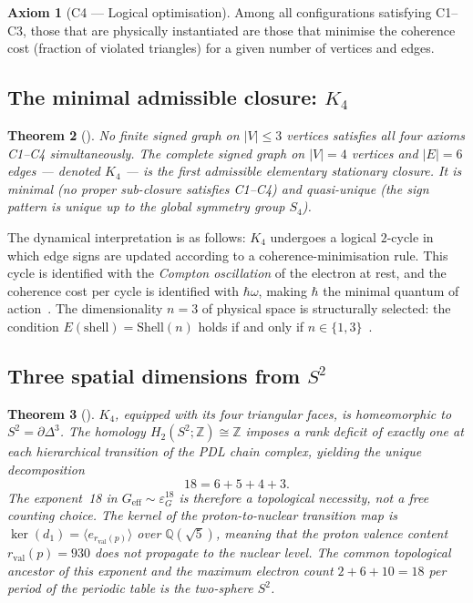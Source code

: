 \documentclass[11pt,a4paper]{article}
\theoremstyle{plain}
\newtheorem{theorem}{Theorem}[section]
\theoremstyle{definition}
\newtheorem{axiom}[theorem]{Axiom}
\theoremstyle{remark}
\newcommand{\Kfour}{K_4}
\newcommand{\Geff}{G_{\mathrm{eff}}}
\newcommand{\epsG}{\varepsilon_G}
\newcommand{\rval}{r_{\mathrm{val}}}
\begin{document}
\begin{axiom}[C4 — Logical optimisation]
Among all configurations satisfying C1--C3, those that are physically instantiated are those that minimise the coherence cost (fraction of violated triangles) for a given number of vertices and edges.
\end{axiom}

\subsection{The minimal admissible closure: \texorpdfstring{$\Kfour$}{K4}}
\label{subsec:K4}

\begin{theorem}[\citep{D16a}]
\label{thm:K4}
No finite signed graph on $|V|\leq 3$ vertices satisfies all four axioms C1--C4 simultaneously.
The complete signed graph on $|V|=4$ vertices and $|E|=6$ edges — denoted $\Kfour$ — is the first admissible elementary stationary closure.
It is minimal (no proper sub-closure satisfies C1--C4) and quasi-unique (the sign pattern is unique up to the global symmetry group $S_4$).
\end{theorem}

The dynamical interpretation is as follows: $\Kfour$ undergoes a logical $2$-cycle in which edge signs are updated according to a coherence-minimisation rule.
This cycle is identified with the \emph{Compton oscillation} of the electron at rest, and the coherence cost per cycle is identified with $\hbar\omega$, making $\hbar$ the minimal quantum of action~\citep{D01,D02}.
The dimensionality $n=3$ of physical space is structurally selected: the condition $E(\mathrm{shell})=\mathrm{Shell}(n)$ holds if and only if $n\in\{1,3\}$~\citep{D23}.

\subsection{Three spatial dimensions from \texorpdfstring{$S^2$}{S2}}
\label{subsec:topology}

\begin{theorem}[\citep{D23}]
\label{thm:exponent18}
$\Kfour$, equipped with its four triangular faces, is homeomorphic to $S^2=\partial\Delta^3$.
The homology $H_2(S^2;\mathbb{Z})\cong\mathbb{Z}$ imposes a rank deficit of exactly one at each hierarchical transition of the PDL chain complex, yielding the unique decomposition
\[
18 = 6 + 5 + 4 + 3.
\]
The exponent~18 in $\Geff\sim\epsG^{18}$ is therefore a topological necessity, not a free counting choice.
The kernel of the proton-to-nuclear transition map is $\ker(d_1)=\langle e_{\rval(p)}\rangle$ over $\mathbb{Q}(\sqrt{5})$, meaning that the proton valence content $\rval(p)=930$ does not propagate to the nuclear level.
The common topological ancestor of this exponent and the maximum electron count $2+6+10=18$ per period of the periodic table is the two-sphere $S^2$.
\end{theorem}
\end{document}
